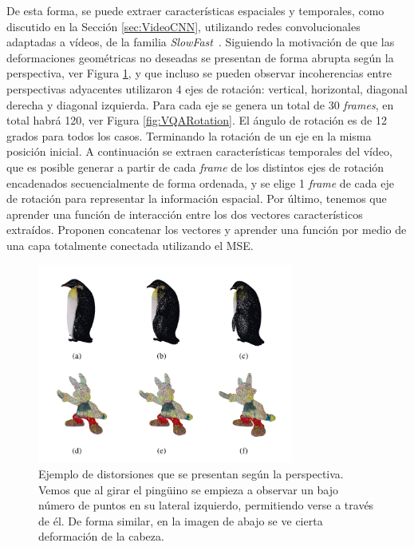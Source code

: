 De esta forma, se puede extraer características espaciales y temporales, como 
discutido en la Sección \ref{sec:VideoCNN}, utilizando redes convolucionales 
adaptadas a vídeos, de la familia \emph{SlowFast}~\cite{SlowFastNetworks}.
Siguiendo la motivación de que las deformaciones geométricas no deseadas se presentan 
de forma abrupta según la perspectiva, ver Figura \ref{fig:ViewPoint}, y que 
incluso se pueden observar incoherencias entre perspectivas adyacentes
utilizaron 4 ejes de rotación: vertical, horizontal, diagonal derecha 
y diagonal izquierda. Para cada eje se genera un total de 30 \emph{frames}, 
en total habrá 120, ver Figura \ref{fig:VQARotation}. El ángulo de rotación es de 12 grados para todos los casos. 
Terminando la rotación de un eje en la misma posición inicial. 
A continuación se extraen características temporales del vídeo, que es posible 
generar a partir de cada \emph{frame} de los distintos ejes de rotación encadenados
secuencialmente de forma ordenada, y se elige 1 \emph{frame} de cada 
eje de rotación para representar la información espacial. Por último, 
tenemos que aprender una función de interacción entre los dos vectores característicos 
extraídos. Proponen concatenar los vectores y aprender una función por 
medio de una capa totalmente conectada utilizando el MSE.

\begin{figure}
  \begin{center}
    \includegraphics[width=0.75\textwidth]{imagenes/chapter4/ViewPoint}
  \end{center}
  \caption[Ejemplo de distorsiones que se presentan según la perspectiva]{
  Ejemplo de distorsiones que se presentan según la perspectiva.
Vemos que al girar el pingüino se empieza a observar un bajo número de puntos en su 
lateral izquierdo, permitiendo verse a través de él. De forma similar, 
en la imagen de abajo se ve cierta deformación de la cabeza.}
  \label{fig:ViewPoint}
\end{figure}

